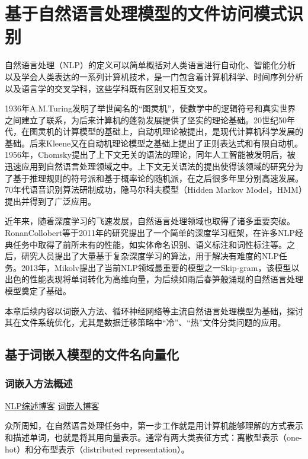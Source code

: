 \chapter{基于自然语言处理模型的文件访问模式识别}
自然语言处理（NLP）的定义可以简单概括对人类语言进行自动化、智能化分析以及学会人类表达的一系列计算机技术，是一门包含着计算机科学、时间序列分析以及语言学的交叉学科，这些学科既有区别又相互交叉。

1936年A.M.Turing发明了举世闻名的“图灵机”，使数学中的逻辑符号和真实世界之间建立了联系，为后来计算机的蓬勃发展提供了坚实的理论基础。20世纪50年代，在图灵机的计算模型的基础上，自动机理论被提出，是现代计算机科学发展的基础\cite{自然语言处理的历史与现状}。后来Kleene又在自动机理论模型之基础上提出了正则表达式和有限自动机。1956年，Chomsky提出了上下文无关的语法的理论，同年人工智能被发明后，被迅速应用到自然语言处理领域之中。上下文无关语法的提出使得该领域的研究分为了基于推理规则的符号派和基于概率论的随机派\cite{宋一凡2019自然语言处理的发展历史与现状}，在之后很多年里分别高速发展。70年代语音识别算法研制成功，隐马尔科夫模型（Hidden Markov Model，HMM）提出并得到了广泛应用\cite{自然语言处理的历史与现状}。

近年来，随着深度学习的飞速发展，自然语言处理领域也取得了诸多重要突破。RonanCollobert等\cite{Natural_language_processing_(almost)_from_scratch}于2011年的研究提出了一个简单的深度学习框架，在许多NLP经典任务中取得了前所未有的性能，如实体命名识别、语义标注和词性标注等。之后，研究人员提出了大量基于复杂深度学习的算法，用于解决有难度的NLP任务。2013年，Mikolv\cite{skipgram}提出了当前NLP领域最重要的模型之一Skip-gram，该模型以出色的性能表现将单词转化为高维向量，为后续如雨后春笋般涌现的自然语言处理模型奠定了基础。

本章后续内容以词嵌入方法、循环神经网络等主流自然语言处理模型为基础，探讨其在文件系统优化，尤其是数据迁移策略中“冷”、“热”文件分类问题的应用。

\section{基于词嵌入模型的文件名向量化}
\subsection{词嵌入方法概述}

\href{https://www.linkresearcher.com/careers/6c7a15b5-236a-40f3-879f-af2ac06c2557}{NLP综述博客}
\href{https://blog.csdn.net/mawenqi0729/article/details/80698350}{词嵌入博客}

众所周知，在自然语言处理任务中，第一步工作就是用计算机能够理解的方式表示和描述单词，也就是将其用向量表示。通常有两大类表征方式：离散型表示（one-hot）和分布型表示（distributed representation）。

